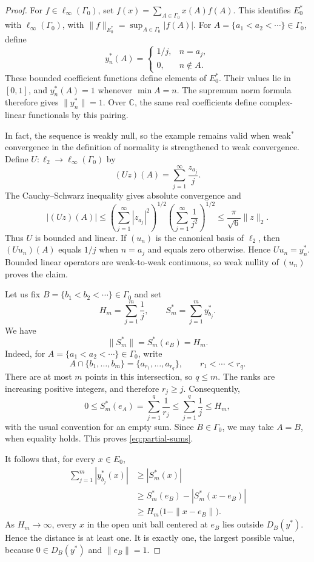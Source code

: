 \documentclass[10pt,a4paper]{amsart}
\begin{document}
\begin{proof}
For $f\in\ell_\infty(\Gamma_0)$, set
$f(x)=\sum_{A\in\Gamma_0}x(A)f(A)$.
This identifies $E_0^*$ with $\ell_\infty(\Gamma_0)$, with
$\|f\|_{E_0^*}=\sup_{A\in\Gamma_0}|f(A)|$. For
$A=\{a_1<a_2<\cdots\}\in\Gamma_0$, define
\[
 y_n^*(A)=
 \begin{cases}
  1/j,&n=a_j,\\
  0,&n\notin A.
 \end{cases}
\]
These bounded coefficient functions define elements of $E_0^*$. Their
values lie in $[0,1]$, and $y_n^*(A)=1$ whenever $\min A=n$.
The supremum norm formula therefore gives $\|y_n^*\|=1$. Over
$\mathbb C$, the same real coefficients define complex-linear
functionals by this pairing.

In fact, the sequence is weakly null, so the example remains valid when
weak$^*$ convergence in the definition of normality is strengthened
to weak convergence. Define $U:\ell_2\to\ell_\infty(\Gamma_0)$ by
\[
 (Uz)(A)=\sum_{j=1}^{\infty}\frac{z_{a_j}}j.
\]
The Cauchy--Schwarz inequality gives absolute convergence and
\[
 |(Uz)(A)|
 \leqslant\left(\sum_{j=1}^{\infty}|z_{a_j}|^2\right)^{1/2}
            \left(\sum_{j=1}^{\infty}\frac1{j^2}\right)^{1/2}
 \leqslant\frac\pi{\sqrt6}\|z\|_2.
\]
Thus $U$ is bounded and linear. If $(u_n)$ is the canonical basis of
$\ell_2$, then $(Uu_n)(A)$ equals $1/j$ when $n=a_j$ and equals
zero otherwise. Hence $Uu_n=y_n^*$. Bounded linear operators are
weak-to-weak continuous, so weak nullity of $(u_n)$ proves the claim.

Let us fix $B=\{b_1<b_2<\cdots\}\in\Gamma_0$ and set
\[
 H_m=\sum_{j=1}^m\frac1j,
 \qquad S_m^*=\sum_{j=1}^m y_{b_j}^*.
\]
We have
\begin{equation}\label{eq:partial-sums}
 \|S_m^*\|=S_m^*(e_B)=H_m.
\end{equation}
Indeed, for $A=\{a_1<a_2<\cdots\}\in\Gamma_0$, write
\[
 A\cap\{b_1,\ldots,b_m\}=\{a_{r_1},\ldots,a_{r_q}\},
 \qquad r_1<\cdots<r_q.
\]
There are at most $m$ points in this intersection, so $q\leqslant m$.
The ranks are increasing positive integers, and therefore
$r_j\geqslant j$. Consequently,
\[
 0\leqslant S_m^*(e_A)
 =\sum_{j=1}^q\frac1{r_j}
 \leqslant\sum_{j=1}^q\frac1j
 \leqslant H_m,
\]
with the usual convention for an empty sum. Since $B\in\Gamma_0$,
we may take $A=B$, when equality holds. This proves
\eqref{eq:partial-sums}.

It follows that, for every $x\in E_0$,
\begin{align*}
 \sum_{j=1}^m|y_{b_j}^*(x)|
 &\geqslant |S_m^*(x)|\\
 &\geqslant S_m^*(e_B)-|S_m^*(x-e_B)|\\
 &\geqslant H_m\bigl(1-\|x-e_B\|\bigr).
\end{align*}
As $H_m\to\infty$, every $x$ in the open unit ball centered at $e_B$
lies outside $D_B(y^*)$. Hence the distance is at least one. It is
exactly one, the largest possible value, because $0\in D_B(y^*)$
and $\|e_B\|=1$.
\end{proof}
\end{document}
